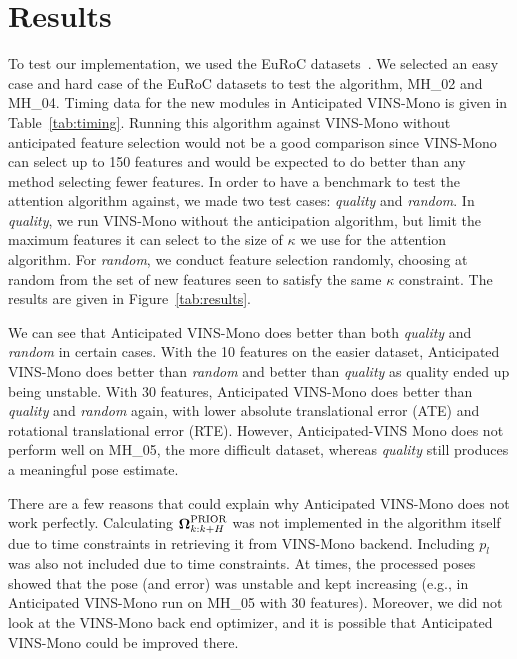 
\section{Results}\label{sec:results}

To test our implementation, we used the EuRoC datasets~\cite{Burri2016}.
We selected an easy case and hard case of the EuRoC datasets to test the algorithm, MH\_02 and MH\_04.
Timing data for the new modules in Anticipated VINS-Mono is given in Table~\ref{tab:timing}.
Running this algorithm against VINS-Mono without anticipated feature selection would not be a good comparison since VINS-Mono can select up to 150 features and would be expected to do better than any method selecting fewer features.
In order to have a benchmark to test the attention algorithm against, we made two test cases: \textit{quality} and \textit{random}.
In \textit{quality}, we run VINS-Mono without the anticipation algorithm, but limit the maximum features it can select to the size of $\kappa$ we use for the attention algorithm.
For \textit{random}, we conduct feature selection randomly, choosing at random from the set of new features seen to satisfy the same $\kappa$ constraint.
The results are given in Figure~\ref{tab:results}.

We can see that Anticipated VINS-Mono does better than both \textit{quality} and \textit{random} in certain cases.
With the 10 features on the easier dataset, Anticipated VINS-Mono does better than \textit{random} and better than \textit{quality} as quality ended up being unstable.
With 30 features, Anticipated VINS-Mono does better than \textit{quality} and \textit{random} again, with lower absolute translational error (ATE) and rotational translational error (RTE).
However, Anticipated-VINS Mono does not perform well on MH\_05, the more difficult dataset, whereas \textit{quality} still produces a meaningful pose estimate.

There are a few reasons that could explain why Anticipated VINS-Mono does not work perfectly.
Calculating ${\boldsymbol \Omega}_{k:k+H}^\text{PRIOR}$ was not implemented in the algorithm itself due to time constraints in retrieving it from VINS-Mono backend.
Including $p_l$ was also not included due to time constraints.
At times, the processed poses showed that the pose (and error) was unstable and kept increasing (e.g., in Anticipated VINS-Mono run on MH\_05 with 30 features).
Moreover, we did not look at the VINS-Mono back end optimizer, and it is possible that Anticipated VINS-Mono could be improved there.

